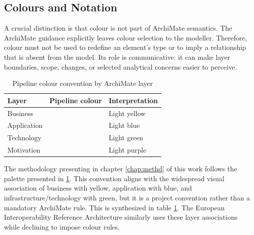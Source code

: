 \subsection{Colours and Notation}

A crucial distinction is that colour is not part of ArchiMate semantics. The ArchiMate guidance explicitly leaves colour selection to the modeller. Therefore, colour must not be used to redefine an element’s type or to imply a relationship that is absent from the model. Its role is communicative: it can make layer boundaries, scope, changes, or selected analytical concerns easier to perceive.

\begin{table}[htbp]
    \centering
    \caption{Pipeline colour convention by ArchiMate layer}
    \label{tab:archimate-layer-colours}
    \begin{tabular}{lll}
        \hline
        \textbf{Layer} & \textbf{Pipeline colour} & \textbf{Interpretation} \\
        \hline
        Business
        & \cellcolor[HTML]{FFFACD}\hspace{2.5cm}\rule{0pt}{2.2ex}
        & Light yellow \\

        Application
        & \cellcolor[HTML]{E0EEEE}\hspace{2.5cm}\rule{0pt}{2.2ex}
        & Light blue \\

        Technology
        & \cellcolor[HTML]{E0FFE0}\hspace{2.5cm}\rule{0pt}{2.2ex}
        & Light green \\

        Motivation
        & \cellcolor{purple!25}\hspace{2.5cm}\rule{0pt}{2.2ex}
        & Light purple \\
        \hline
    \end{tabular}
\end{table}

The methodology presenting in chapter \ref{chap:methd} of this work follows the palette presented in \ref{tab:archimate-layer-colours}. This convention aligns with the widespread visual association of business with yellow, application with blue, and infrastructure/technology with green, but it is a project convention rather than a mandatory ArchiMate rule. This is synthesized in table \ref{tab:archimate-layer-colours}. The European Interoperability Reference Architecture similarly uses these layer associations while declining to impose colour rules.\cite{europeancommission_eira_chapter2}

